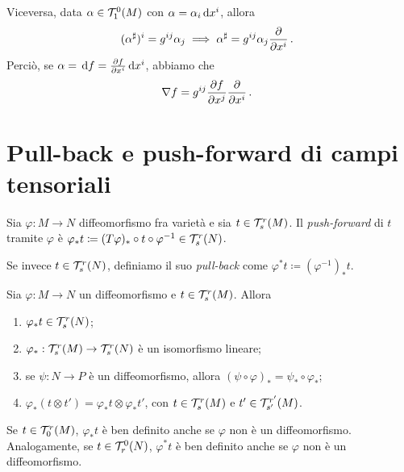 Viceversa, data $\alpha \in \mathcal T_1^0(M)$ con $\alpha = \alpha_i\,\mathrm d x^i$, allora
\begin{equation*}
	(\alpha^\sharp)^i = g^{ij} \alpha_j \implies \alpha^\sharp = g^{ij} \alpha_j\frac{\partial }{\partial x^i} \, \text{. }
\end{equation*}
Perciò, se $\alpha = \,\mathrm d f = \frac{\partial f}{\partial x^i}\,\mathrm d x^i$, abbiamo che
\begin{equation*}
	\nabla f = g^{ij} \frac{\partial f}{\partial x^j} \frac{\partial }{\partial x^i} \, \text{. }
\end{equation*}


\section{Pull-back e push-forward di campi tensoriali}

\begin{definition}
	Sia $\varphi : M \to N$ diffeomorfismo fra varietà e sia $t \in \mathcal T_s^r(M)$. Il \emph{push-forward} di $t$ tramite $\varphi$ è $\varphi_*t \coloneqq (T\varphi)_* \circ t \circ \varphi^{-1} \in \mathcal T_s^r(N)$.
	
	Se invece $t \in \mathcal T_s^r(N)$, definiamo il suo \emph{pull-back} come $\varphi^*t \coloneqq (\varphi^{-1})_* t$.
\end{definition}

\begin{proposition}
	Sia $\varphi: M \to N$ un diffeomorfismo e $t\in \mathcal T_s^r(M)$. Allora
	\begin{enumerate}
		\item $\varphi_*t \in \mathcal T_s^r(N)$;
		\item $\varphi_* : \mathcal T_s^r(M) \to \mathcal T_s^r(N)$ è un isomorfismo lineare;
		\item se $\psi: N \to P$ è un diffeomorfismo, allora $(\psi\circ \varphi)_* = \psi_* \circ \varphi_*$;
		\item $\varphi_*(t\otimes t') = \varphi_* t\otimes \varphi_* t'$, con $t\in \mathcal T_s^r(M)$ e $t'\in \mathcal T_{s'}^{r'}(M)$.
	\end{enumerate}
\end{proposition}

\begin{remark}
	Se $t\in\mathcal T_0^r(M)$, $\varphi_*t$ è ben definito anche se $\varphi$ non è un diffeomorfismo. Analogamente, se $t \in \mathcal T_r^0(N)$, $\varphi^*t$ è ben definito anche se $\varphi$ non è un diffeomorfismo.
\end{remark}















